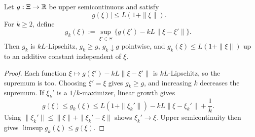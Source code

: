 \begin{lemma}\label{lem:MEK-lipschitz-majorants}
Let $g:\Xi\to\mathbb{R}$ be upper semicontinuous and satisfy
\[
 |g(\xi)|\le L(1+\|\xi\|).
\]
For $k\ge2$, define
\begin{equation}\label{eq:MEK-majorant}
 g_k(\xi):=\sup_{\xi'\in\Xi}
 \{g(\xi')-kL\|\xi-\xi'\|\}.
\end{equation}
Then $g_k$ is $kL$-Lipschitz, $g_k\ge g$, $g_k\downarrow g$ pointwise, and $g_k(\xi)\le L(1+\|\xi\|)$ up to an additive constant independent of $\xi$.
\end{lemma}
\begin{proof}
Each function $\xi\mapsto g(\xi')-kL\|\xi-\xi'\|$ is $kL$-Lipschitz, so the supremum is too.  Choosing $\xi'=\xi$ gives $g_k\ge g$, and increasing $k$ decreases the supremum.  If $\xi_k'$ is a $1/k$-maximizer, linear growth gives
\[
 g(\xi)
 \le g_k(\xi)
 \le L(1+\|\xi_k'\|)-kL\|\xi-\xi_k'\|+\frac1k.
\]
Using $\|\xi_k'\|\le\|\xi\|+\|\xi_k'-\xi\|$ shows $\xi_k'\to\xi$.  Upper semicontinuity then gives $\limsup g_k(\xi)\le g(\xi)$.
\end{proof}

